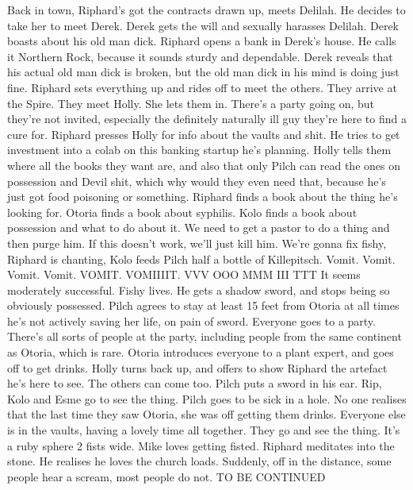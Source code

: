 Back in town, Riphard’s got the contracts drawn up, meets Delilah. He decides to take her to meet Derek.\medskip
Derek gets the will and sexually harasses Delilah.\medskip
Derek boasts about his old man dick.\medskip
Riphard opens a bank in Derek’s house. He calls it Northern Rock, because it sounds sturdy and dependable.\medskip
Derek reveals that his actual old man dick is broken, but the old man dick in his mind is doing just fine.\medskip
Riphard sets everything up and rides off to meet the others.\medskip
They arrive at the Spire.\medskip
They meet Holly. She lets them in.\medskip
There’s a party going on, but they’re not invited, especially the definitely naturally ill guy they’re here to find a cure for.\medskip
Riphard presses Holly for info about the vaults and shit.\medskip
He tries to get investment into a colab on this banking startup he’s planning.\medskip
Holly tells them where all the books they want are, and also that only Pilch can read the ones on possession and Devil shit, which why would they even need that, because he’s just got food poisoning or something.\medskip
Riphard finds a book about the thing he’s looking for. Otoria finds a book about syphilis. Kolo finds a book about possession and what to do about it.\medskip
We need to get a pastor to do a thing and then purge him.\medskip
If this doesn’t work, we’ll just kill him.\medskip
We’re gonna fix fishy,\medskip
Riphard is chanting, Kolo feeds Pilch half a bottle of Killepitsch.\medskip
Vomit.\medskip
Vomit. Vomit. Vomit.\medskip
VOMIT.\medskip
VOMIIIIT.\medskip
VVV OOO MMM III TTT\medskip
It seems moderately successful. Fishy lives.\medskip
He gets a shadow sword, and stops being so obviously possessed.\medskip
Pilch agrees to stay at least 15 feet from Otoria at all times he's not actively saving her life, on pain of sword.\medskip
Everyone goes to a party.\medskip
There’s all sorts of people at the party, including people from the same continent as Otoria, which is rare.\medskip
Otoria introduces everyone to a plant expert, and goes off to get drinks.\medskip
Holly turns back up, and offers to show Riphard the artefact he’s here to see. The others can come too.\medskip
Pilch puts a sword in his ear.\medskip
Rip, Kolo and Esme go to see the thing.\medskip
Pilch goes to be sick in a hole.\medskip
No one realises that the last time they saw Otoria, she was off getting them drinks.\medskip
Everyone else is in the vaults, having a lovely time all together.\medskip
They go and see the thing. It’s a ruby sphere 2 fists wide.\medskip
Mike loves getting fisted.\medskip
Riphard meditates into the stone. He realises he loves the church loads.\medskip
Suddenly, off in the distance, some people hear a scream, most people do not.\medskip
TO BE CONTINUED